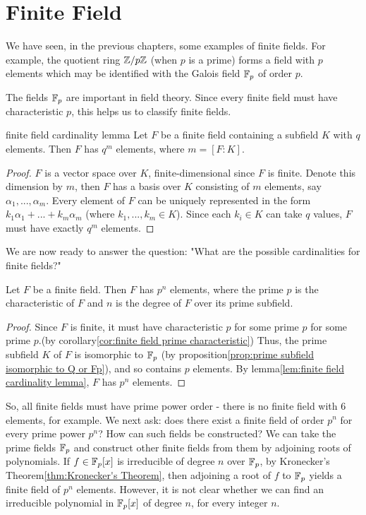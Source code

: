 \chapter{Finite Field}\label{chp:6_4}

We have seen, in the previous chapters, some examples of finite fields. For example, the quotient
ring $\mathbb{Z}/p\mathbb{Z}$ (when $p$ is a prime) forms a field with $p$ elements which may be identified with the
Galois field $\mathbb{F}_p$ of order $p$.

The fields $\mathbb{F}_p$ are important in field theory.
Since every finite field must have characteristic $p$, 
this helps us to classify finite fields.

\begin{lemma}{}{finite field cardinality lemma}
    Let $F$ be a finite field containing a subfield $K$ with $q$ elements. Then $F$ has $q^m$ elements,
    where $m=[F:K]$.
\end{lemma}
\begin{proof}
    $F$ is a vector space over $K$, finite-dimensional since $F$ is finite.
    Denote this dimension by $m$, then $F$ has a basis over $K$ consisting of $m$ elements,
    say $\alpha_1,...,\alpha_m$. Every element of $F$ can be uniquely represented in the form
    $k_1\alpha_1+...+k_m\alpha_m$ (where $k_1,...,k_m\in K$).
    Since each $k_i\in K$ can take $q$ values, $F$ must have exactly $q^m$ elements.
\end{proof}

We are now ready to answer the question: "What are the possible cardinalities for finite fields?"

\begin{proposition}{}{}
    Let $F$ be a finite field.
    Then $F$ has $p^n$ elements, where the prime $p$ is the characteristic of $F$ and 
    $n$ is the degree of $F$ over its prime subfield.
\end{proposition}
\begin{proof}
    Since $F$ is finite, it must have characteristic $p$ for some prime $p$ for some prime $p$.(by corollary\ref{cor:finite field prime characteristic})
    Thus, the prime subfield $K$ of $F$ is isomorphic to $\mathbb{F}_p$ (by proposition\ref{prop:prime subfield isomorphic to Q or Fp}), 
    and so contains $p$ elements. By lemma\ref{lem:finite field cardinality lemma}, $F$ has $p^n$ elements.
\end{proof}

So, all finite fields must have prime power order - 
there is no finite field with $6$ elements, for example.
We next ask: does there exist a finite field of order $p^n$
for every prime power $p^n$? How can such fields be constructed?
We can take the prime fields $\mathbb{F}_p$ and construct other finite
fields from them by adjoining roots of polynomials. If $f \in \mathbb{F}_p[x]$ is irreducible of degree $n$ 
over $\mathbb{F}_p$, by Kronecker's Theorem\ref{thm:Kronecker's Theorem}, 
then adjoining a root of $f$ to $\mathbb{F}_p$ yields a finite field of $p^n$
elements. However, it is not clear whether
we can find an irreducible polynomial in $\mathbb{F}_p[x]$ of degree $n$, 
for every integer $n$.


